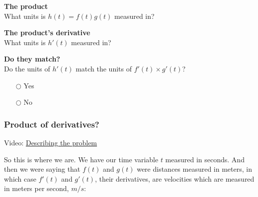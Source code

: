 \documentclass[pdftex, brazil, 12pt, twoside]{article}
\begin{document}
\begin{exercise}
  \textbf{The product}\\%
  What units is $h(t) = f(t)g(t)$ measured in?
\end{exercise}

\begin{exercise}
  \textbf{The product's derivative}\\%
  What units is $h'(t)$ measured in?
\end{exercise}

\begin{exercise}
  \textbf{Do they match?}\\%
  Do the units of $h'(t)$ match the units of $f'(t) \times g'(t)$?
  \begin{itemize}[noitemsep]
  \item[$\bigcirc$] Yes
  \item[$\bigcirc$] No
  \end{itemize}
\end{exercise}

\subsubsection{Product of derivatives?}
\label{u2-product-rule-product-of-derivatives}

Video: \href{https://www.youtube.com/watch?v=IFeQuG1hxL4}{Describing the problem}

So this is where we are.
We have our time variable $t$ measured in seconds.
And then we were saying that $f(t)$ and $g(t)$
were distances measured in meters, in which case
$f'(t)$ and $g'(t)$, their derivatives,
are velocities which are measured in meters per second, $m/s$:

\begin{figure}[H]
  \begin{center}
  \end{center}
\end{figure}
\end{document}
